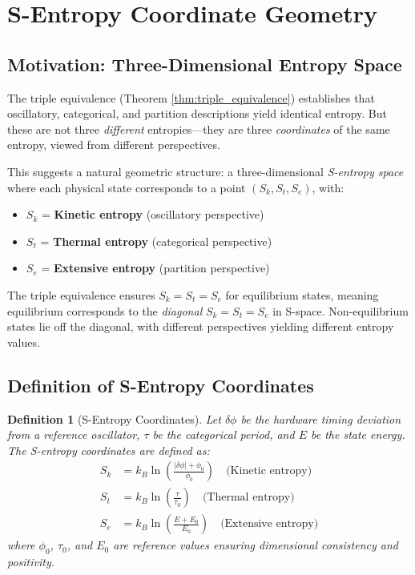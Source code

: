 \documentclass[twocolumn,10pt]{article}
\newtheorem{definition}[theorem]{Definition}
\theoremstyle{remark}
\begin{document}
\section{S-Entropy Coordinate Geometry}
\label{sec:geometry}

\subsection{Motivation: Three-Dimensional Entropy Space}

The triple equivalence (Theorem \ref{thm:triple_equivalence}) establishes that oscillatory, categorical, and partition descriptions yield identical entropy. But these are not three \textit{different} entropies—they are three \textit{coordinates} of the same entropy, viewed from different perspectives.

This suggests a natural geometric structure: a three-dimensional \textit{S-entropy space} where each physical state corresponds to a point $(S_k, S_t, S_e)$, with:
\begin{itemize}
    \item $S_k$ = \textbf{Kinetic entropy} (oscillatory perspective)
    \item $S_t$ = \textbf{Thermal entropy} (categorical perspective)
    \item $S_e$ = \textbf{Extensive entropy} (partition perspective)
\end{itemize}

The triple equivalence ensures $S_k = S_t = S_e$ for equilibrium states, meaning equilibrium corresponds to the \textit{diagonal} $S_k = S_t = S_e$ in S-space. Non-equilibrium states lie off the diagonal, with different perspectives yielding different entropy values.

\subsection{Definition of S-Entropy Coordinates}

\begin{definition}[S-Entropy Coordinates]
\label{def:S_coordinates}
Let $\delta\phi$ be the hardware timing deviation from a reference oscillator, $\tau$ be the categorical period, and $E$ be the state energy. The S-entropy coordinates are defined as:
\begin{align}
    S_k &= k_B \ln\left(\frac{|\delta\phi| + \phi_0}{\phi_0}\right) \quad \text{(Kinetic entropy)} \label{eq:Sk_def} \\
    S_t &= k_B \ln\left(\frac{\tau}{\tau_0}\right) \quad \text{(Thermal entropy)} \label{eq:St_def} \\
    S_e &= k_B \ln\left(\frac{E + E_0}{E_0}\right) \quad \text{(Extensive entropy)} \label{eq:Se_def}
\end{align}
where $\phi_0$, $\tau_0$, and $E_0$ are reference values ensuring dimensional consistency and positivity.
\end{definition}
\end{document}
